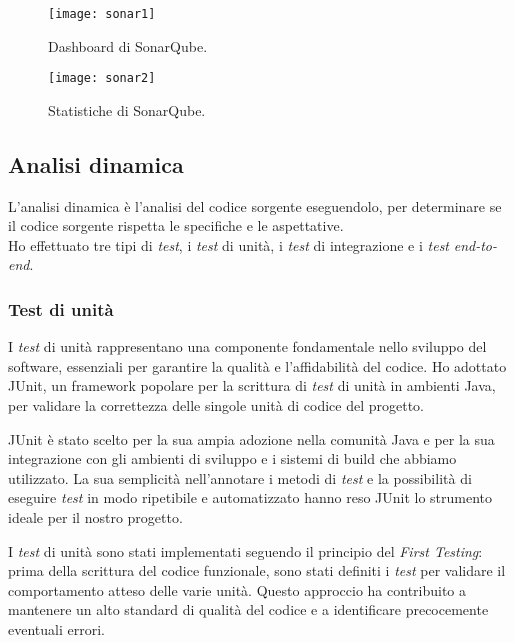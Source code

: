 \begin{figure}[h]
  \centering
  \begin{minipage}{0.49\textwidth}
      \centering
      \texttt{[image: sonar1]} 
      \caption{Dashboard di SonarQube.}
      \label{fig:sonar1}
  \end{minipage}\hfill
  \begin{minipage}{0.49\textwidth}
    \centering
    \texttt{[image: sonar2]}
    \caption{Statistiche di SonarQube.}
    \label{fig:sonar2}
  \end{minipage}
\end{figure}

\subsection*{Analisi dinamica}
L'analisi dinamica è l'analisi del codice sorgente eseguendolo, per determinare se il codice sorgente rispetta
le specifiche e le aspettative.\\
Ho effettuato tre tipi di \textit{test}, i \textit{test} di unità, i \textit{test} di integrazione e i \textit{test} \textit{end-to-end}.\\
\subsubsection*{Test di unità}
I \textit{test} di unità rappresentano una componente fondamentale nello sviluppo del software, 
essenziali per garantire la qualità e l'affidabilità del codice. 
Ho adottato JUnit, un framework popolare per la scrittura di \textit{test} di unità in ambienti Java, 
per validare la correttezza delle singole unità di codice del progetto.

JUnit è stato scelto per la sua ampia adozione nella comunità Java e per la sua integrazione con gli ambienti di sviluppo e i sistemi di build che abbiamo utilizzato. La sua semplicità nell'annotare i metodi di \textit{test} e la possibilità di eseguire \textit{test} in modo ripetibile e automatizzato hanno reso JUnit lo strumento ideale per il nostro progetto.

I \textit{test} di unità sono stati implementati seguendo il principio del \textit{First Testing}: 
prima della scrittura del codice funzionale, sono stati definiti i \textit{test} per validare il comportamento atteso delle varie unità. 
Questo approccio ha contribuito a mantenere un alto standard di qualità del codice e a identificare precocemente eventuali errori.

